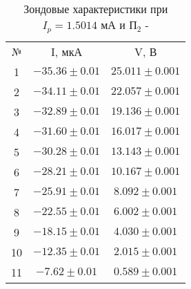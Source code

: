 \documentclass[a4paper]{article}
\begin{document}
        \begin{table}[h]
    \centering
        \begin{tabular}{|c|c|c|}
        \cline{1-3}
        № & I, мкА& V, В\\ \cline{1-3}
        1 & $-35.36\pm 0.01$& $25.011 \pm 0.001$\\ \cline{1-3}
        2 & $-34.11\pm 0.01$& $22.057 \pm 0.001$\\ \cline{1-3}
        3 & $-32.89\pm 0.01$& $19.136 \pm 0.001$\\ \cline{1-3}
        4 & $-31.60\pm 0.01$& $16.017 \pm 0.001$\\ \cline{1-3}
        5 & $-30.28\pm 0.01$& $13.143 \pm 0.001$\\ \cline{1-3}
        6 & $-28.21\pm 0.01$& $10.167 \pm 0.001$\\ \cline{1-3}
        7 & $-25.91\pm 0.01$& $8.092 \pm 0.001$\\ \cline{1-3}
        8 & $-22.55\pm 0.01$& $6.002 \pm 0.001$\\ \cline{1-3}
        9 & $-18.15\pm 0.01$& $4.030 \pm 0.001$\\ \cline{1-3}
        10 & $-12.35\pm 0.01$& $2.015 \pm 0.001$\\ \cline{1-3}
        11 & $-7.62\pm 0.01$& $0.589 \pm 0.001$\\ \cline{1-3}
        \end{tabular}
        \caption{Зондовые характеристики при $I_p = 1.5014$ мА и $\text{П}_2$ -}
        \label{tab:my_label}
    \end{table}

\end{document}
